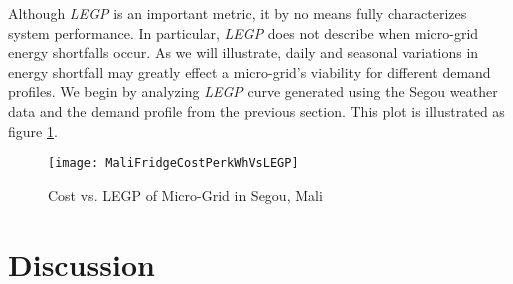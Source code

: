 \documentclass{article}
\begin{document}

Although \emph{LEGP} is an important metric, it by no means fully characterizes system performance. 
In particular, \emph{LEGP} does not describe when micro-grid energy shortfalls occur.
As we will illustrate, daily and seasonal variations in energy shortfall may greatly effect a micro-grid's viability for different demand profiles. 
We begin by analyzing \emph{LEGP} curve generated using the Segou weather data and the demand profile from the previous section. 
This plot is illustrated as figure \ref{CostVLEGPMali}.



\begin{figure}[ht]  
  \centering
    \texttt{[image: MaliFridgeCostPerkWhVsLEGP]}
  \caption{Cost vs. LEGP of Micro-Grid in Segou, Mali}
  \label{CostVLEGPMali}
\end{figure}


\section{Discussion}
\end{document}
